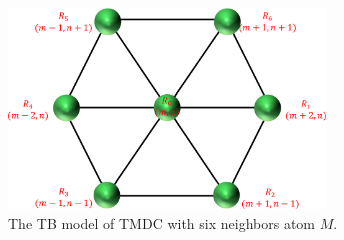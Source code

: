 \documentclass{report}
\begin{document}
\begin{figure}[H]
	\centering
	\includegraphics[width=0.75\textwidth,height=0.5\linewidth]{pic/siteindex_crop.pdf}
	\caption{\label{fig:site index} The TB model of TMDC with six neighbors atom $M$.}
\end{figure}
\end{document}
